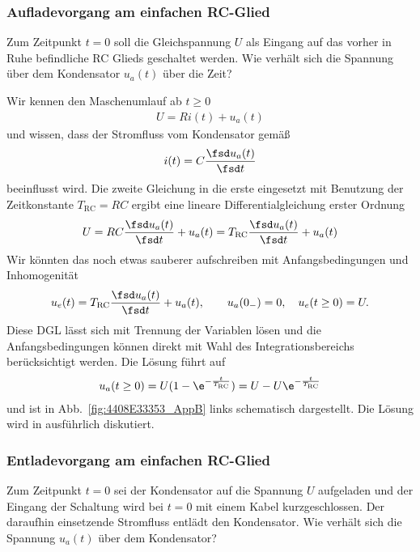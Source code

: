 \subsubsection*{Aufladevorgang am einfachen RC-Glied}

Zum Zeitpunkt $t=0$ soll die Gleichspannung $U$ als Eingang auf das vorher in
Ruhe befindliche RC Glieds geschaltet werden.
%
Wie verhält sich die Spannung über dem Kondensator $u_a(t)$ über die Zeit?

Wir kennen den Maschenumlauf ab $t\geq 0$
\begin{align}
U = R i(t) + u_a(t)
\end{align}
und wissen, dass der Stromfluss vom Kondensator gemäß
\begin{align}
i(t) = C \frac{\fsd u_a(t)}{\fsd t}
\end{align}
beeinflusst wird.
Die zweite Gleichung in die erste eingesetzt mit Benutzung der Zeitkonstante
$T_\text{RC} = R C$ ergibt eine lineare Differentialgleichung erster Ordnung
\begin{align}
U = R C \frac{\fsd u_a(t)}{\fsd t} + u_a(t) =
T_\text{RC} \frac{\fsd u_a(t)}{\fsd t} + u_a(t)
\end{align}
Wir könnten das noch etwas sauberer aufschreiben mit Anfangsbedingungen
und Inhomogenität
\begin{align}
u_e(t) = T_\text{RC} \frac{\fsd u_a(t)}{\fsd t} + u_a(t),
\qquad u_a(0_-)=0,\quad u_e(t\geq 0) = U.
\end{align}
Diese DGL lässt sich mit Trennung der Variablen lösen und die Anfangsbedingungen
können direkt mit Wahl des Integrationsbereichs berücksichtigt werden.
%
Die Lösung führt auf
\begin{align}
u_a(t \geq 0) = U(1-\e^{-\frac{t}{T_\text{RC}}}) = U - U\e^{-\frac{t}{T_\text{RC}}}
\end{align}
und ist in Abb.~\ref{fig:4408E33353_AppB} links schematisch dargestellt.
%
Die Lösung wird in \cite[Lap. 15.4.4]{Marinescu2020} ausführlich diskutiert.

\subsubsection*{Entladevorgang am einfachen RC-Glied}

Zum Zeitpunkt $t=0$ sei der Kondensator auf die Spannung $U$ aufgeladen und
der Eingang der Schaltung wird bei $t=0$ mit einem Kabel kurzgeschlossen.
Der daraufhin einsetzende Stromfluss entlädt den Kondensator.
Wie verhält sich die Spannung $u_a(t)$ über dem Kondensator?

